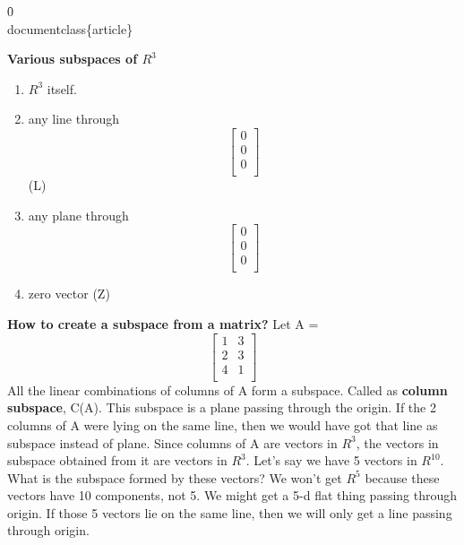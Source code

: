 \f0\fs24 \cf0 \\documentclass\{article\}\
\begin{document}
\textbf{Various subspaces of $R^3$}
\begin{enumerate}
    \item $R^3$ itself. 
    \item any line through \[
\begin{bmatrix}
0\\
0\\
0\\
\end{bmatrix}
\] (L)
    \item any plane through \[
\begin{bmatrix}
0\\
0\\
0\\
\end{bmatrix}
\]
    \item zero vector (Z)
    
\end{enumerate}
\textbf{How to create a subspace from a matrix?}\newline
Let A  = \[
\begin{bmatrix}
1 & 3\\
2& 3\\
4 & 1\\
\end{bmatrix}
\]
All the linear combinations of columns of A form a subspace. Called as \textbf{column subspace}, C(A). This subspace is a plane passing through the origin. If the 2 columns of A were lying on the same line, then we would have got that line as subspace instead of plane.
Since columns of A are vectors in $R^3$, the vectors in subspace obtained from it are vectors in $R^3$.
\newline
Let's say we have 5 vectors in $R^{10}$. What is the subspace formed by these vectors? \newline
We won't get $R^5$ because these vectors have 10 components, not 5. We might get a 5-d flat thing passing through origin. If those 5 vectors lie on the same line, then we will only get a line passing through origin.
\end{document}
